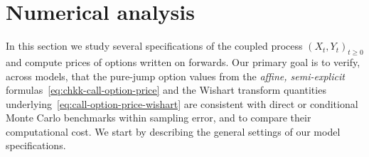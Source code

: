 \documentclass[10pt,a4paper,reqno]{amsart}
\numberwithin{equation}{section}
\theoremstyle{plain}
\theoremstyle{definition}
\theoremstyle{example}
\begin{document}
\section{Numerical analysis}\label{sec:numerics}
In this section we study several specifications of the coupled process $(X_t,Y_t)_{t\geq 0}$ and compute prices of options written on forwards. Our primary goal is to verify, across models, that the pure-jump option values from the \emph{affine, semi-explicit} formulas~\eqref{eq:chkk-call-option-price} and the Wishart transform quantities underlying~\eqref{eq:call-option-price-wishart} are consistent with direct or conditional Monte Carlo benchmarks within sampling error, and to compare their computational cost. We start by describing the general settings of our model specifications.
\end{document}

